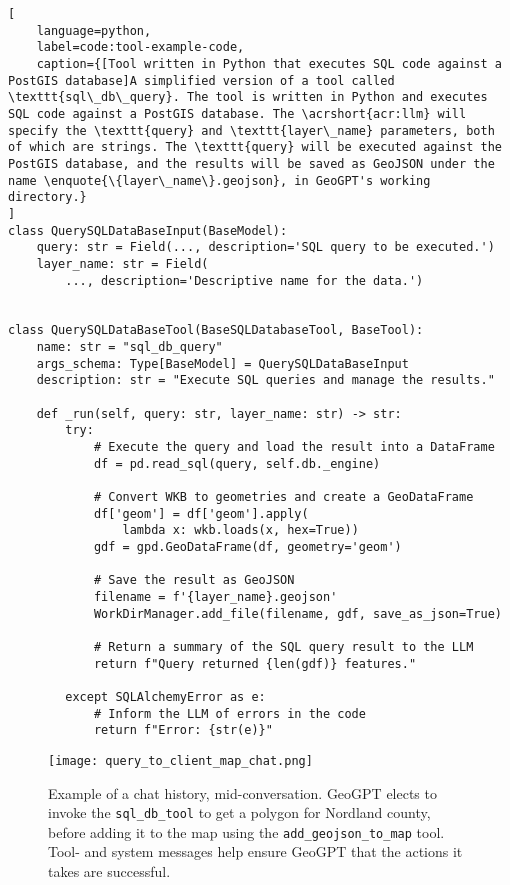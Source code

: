 \begin{lstlisting}[
    language=python,
    label=code:tool-example-code,
    caption={[Tool written in Python that executes SQL code against a PostGIS database]A simplified version of a tool called \texttt{sql\_db\_query}. The tool is written in Python and executes SQL code against a PostGIS database. The \acrshort{acr:llm} will specify the \texttt{query} and \texttt{layer\_name} parameters, both of which are strings. The \texttt{query} will be executed against the PostGIS database, and the results will be saved as GeoJSON under the name \enquote{\{layer\_name\}.geojson}, in GeoGPT's working directory.} 
]
class QuerySQLDataBaseInput(BaseModel):
    query: str = Field(..., description='SQL query to be executed.')
    layer_name: str = Field(
        ..., description='Descriptive name for the data.')


class QuerySQLDataBaseTool(BaseSQLDatabaseTool, BaseTool):
    name: str = "sql_db_query"
    args_schema: Type[BaseModel] = QuerySQLDataBaseInput
    description: str = "Execute SQL queries and manage the results."

    def _run(self, query: str, layer_name: str) -> str:
        try:
            # Execute the query and load the result into a DataFrame
            df = pd.read_sql(query, self.db._engine)

            # Convert WKB to geometries and create a GeoDataFrame
            df['geom'] = df['geom'].apply(
                lambda x: wkb.loads(x, hex=True))
            gdf = gpd.GeoDataFrame(df, geometry='geom')

            # Save the result as GeoJSON
            filename = f'{layer_name}.geojson'
            WorkDirManager.add_file(filename, gdf, save_as_json=True)

            # Return a summary of the SQL query result to the LLM
            return f"Query returned {len(gdf)} features."

        except SQLAlchemyError as e:
            # Inform the LLM of errors in the code
            return f"Error: {str(e)}"
\end{lstlisting}

\begin{figure}
    \centering
    \texttt{[image: query\_to\_client\_map\_chat.png]}
    \caption[Example of a chat history]{Example of a chat history, mid-conversation. GeoGPT elects to invoke the \texttt{sql\_db\_tool} to get a polygon for Nordland county, before adding it to the map using the \texttt{add\_geojson\_to\_map} tool. Tool- and system messages help ensure GeoGPT that the actions it takes are successful.}
    \label{fig:chat-trace-example}
\end{figure}


